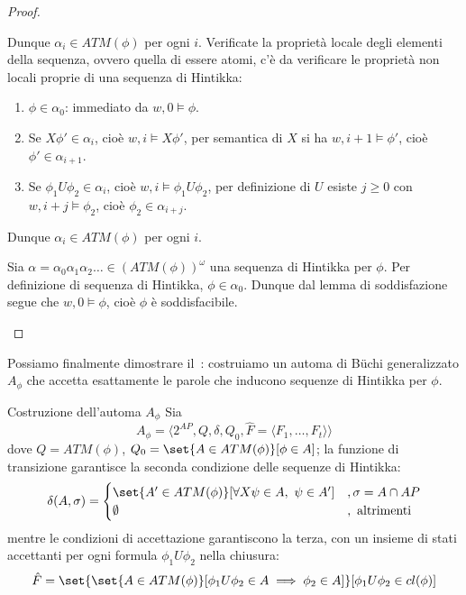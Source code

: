 \begin{proof}
\begin{description}
      Dunque \(\alpha_i \in ATM(\phi)\) per ogni \(i\). Verificate la proprietà locale degli elementi della sequenza, ovvero quella di essere atomi, c'è da verificare le proprietà non locali proprie di una sequenza di Hintikka:
      \begin{enumerate}
        \item \(\phi \in \alpha_0\): immediato da \(w,0\models\phi\).
        \item Se \(X\phi' \in \alpha_i\), cioè \(w,i \models X\phi'\), per semantica di \(X\) si ha \(w,i{+}1\models\phi'\), cioè \(\phi' \in \alpha_{i+1}\).
        \item Se \(\phi_1 U \phi_2 \in \alpha_i\), cioè \(w,i\models\phi_1 U\phi_2\), per definizione di \(U\) esiste \(j\geq 0\) con \(w,i{+}j\models\phi_2\), cioè \(\phi_2 \in \alpha_{i+j}\).
      \end{enumerate}
      Dunque \(\alpha_i \in ATM(\phi)\) per ogni \(i\).
    \item[(\(\Leftarrow\))] Sia \(\alpha = \alpha_0\alpha_1\alpha_2\ldots \in {(ATM(\phi))}^\omega\) una sequenza di Hintikka per \(\phi\). Per definizione di sequenza di Hintikka, \(\phi \in \alpha_0\). Dunque dal lemma di soddisfazione segue che \(w,0\models\phi\), cioè \(\phi\) è soddisfacibile.

  \end{description}
\end{proof}

Possiamo finalmente dimostrare il~: costruiamo un automa di Büchi generalizzato \(A_\phi\) che accetta esattamente le parole che inducono sequenze di Hintikka per \(\phi\).

\begin{definition}{Costruzione dell'automa \(A_\phi\)}
  Sia \[A_\phi = \langle 2^{AP}, Q, \delta, Q_0, \hat{F} = \langle F_1, \ldots, F_t\rangle\rangle\]
  dove \(Q = ATM(\phi)\), \(Q_0 = \set{A \in ATM(\phi) }[\phi \in A]\); la funzione di transizione garantisce la seconda condizione delle sequenze di Hintikka:
  \[\delta(A,\sigma)=\begin{cases}
      \set{A'\in ATM(\phi)}[\forall X\psi \in A,\ \psi \in A'] & , \sigma = A \cap AP \\
      \emptyset                                                & , \text{ altrimenti}
    \end{cases}\]
  mentre le condizioni di accettazione garantiscono la terza, con un insieme di stati accettanti per ogni formula \(\phi_1 U \phi_2\) nella chiusura:
  \[\hat{F} = \set{\set{A\in ATM(\phi)}[\phi_1 U \phi_2 \in A \implies \phi_2\in A]}[\phi_1 U \phi_2 \in cl(\phi)]\]
\end{definition}

